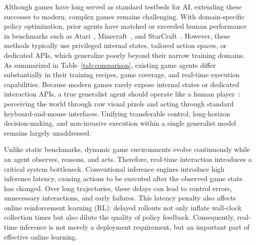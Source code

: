 Although games have long served as standard testbeds for AI, extending these successes to modern, complex games remains challenging. With domain-specific policy optimization, prior agents have matched or exceeded human performance in benchmarks such as Atari~\cite{atari}, Minecraft~\cite{fan2022minedojo}, and StarCraft~\cite{starcraft}. However, these methods typically use privileged internal states, tailored action spaces, or dedicated APIs, which generalize poorly beyond their narrow training domains. As summarized in Table~\ref{tab:comparison}, existing game agents differ substantially in their training recipes, game coverage, and real-time execution capabilities. Because modern games rarely expose internal states or dedicated interaction APIs, a true generalist agent should operate like a human player~\cite{tan2025lumine,wang2025gametars, player1}: perceiving the world through raw visual pixels and acting through standard keyboard-and-mouse interfaces. Unifying transferable control, long-horizon decision-making, and non-invasive execution within a single generalist model remains largely unaddressed.

Unlike static benchmarks, dynamic game environments evolve continuously while an agent observes, reasons, and acts. Therefore, real-time interaction introduces a critical system bottleneck. Conventional inference engines introduce high inference latency, causing actions to be executed after the observed game state has changed. Over long trajectories, these delays can lead to control errors, unnecessary interactions, and early failures. This latency penalty also affects online reinforcement learning (RL): delayed rollouts not only inflate wall-clock collection times but also dilute the quality of policy feedback. Consequently, real-time inference is not merely a deployment requirement, but an important part of effective online learning.

